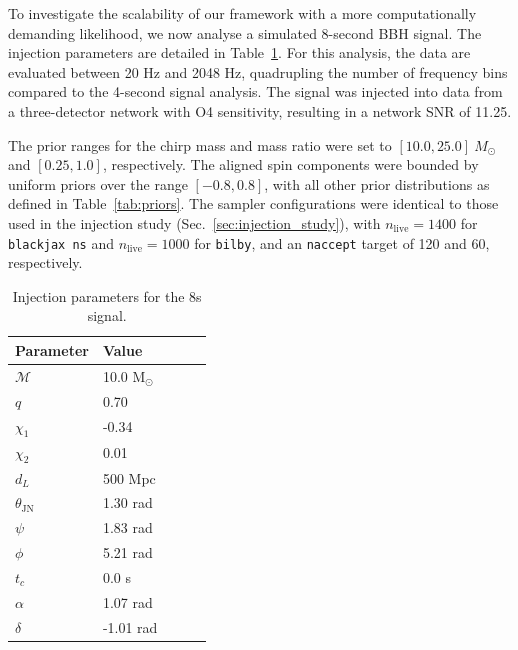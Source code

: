 \documentclass[fleqn,usenatbib]{mnras}
\begin{document}
To investigate the scalability of our framework with a more
computationally demanding likelihood, we now analyse a simulated
8-second BBH signal. The injection parameters are detailed in
Table~\ref{tab:8s_injection_params}. For this analysis, the data are
evaluated between 20 Hz and 2048 Hz, quadrupling the number of
frequency bins compared to the 4-second signal analysis. The signal was
injected into data from a three-detector network with O4 sensitivity,
resulting in a network SNR of 11.25.

The prior ranges for the chirp mass and mass ratio were set to
$[10.0, 25.0]~M_{\odot}$ and $[0.25, 1.0]$, respectively. The aligned
spin components were bounded by uniform priors over the range
$[-0.8, 0.8]$, with all other prior distributions as defined in
Table~\ref{tab:priors}. The sampler configurations were identical to
those used in the injection study (Sec.~\ref{sec:injection_study}), with
$n_{\text{live}}=1400$ for \texttt{blackjax ns} and
$n_{\text{live}}=1000$ for \texttt{bilby}, and an \texttt{naccept}
target of 120 and 60, respectively.

\begin{table}
    \centering
    \caption{Injection parameters for the 8s signal.}
    \label{tab:8s_injection_params}
    \begin{tabular}{l l l c c}
    \hline
    \hline
    \textbf{Parameter} & \textbf{Value} \\
    \hline
    $\mathcal{M}$ & 10.0 M$_{\odot}$ \\
    $q$ & 0.70 \\
    $\chi_1$ & -0.34 \\
    $\chi_2$ & 0.01 \\
    $d_L$ & 500 Mpc \\
    $\theta_{\textrm{JN}}$ & 1.30 rad \\
    $\psi$ & 1.83 rad \\
    $\phi$ & 5.21 rad \\
    $t_c$ & 0.0 s\\
    $\alpha$ & 1.07 rad \\
    $\delta$ & -1.01 rad \\
    \hline
    \hline
    \end{tabular}
    \end{table}
\end{document}
